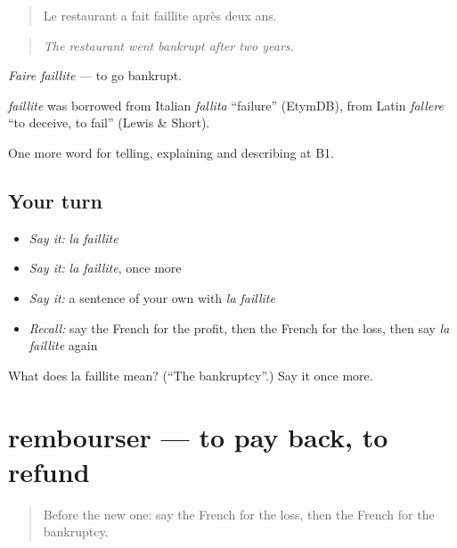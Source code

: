 \begin{quote}
Le restaurant a fait faillite après deux ans.
\end{quote}

\begin{quote}
\emph{The restaurant went bankrupt after two years.}
\end{quote}

\emph{Faire faillite} — to go bankrupt.

\begin{cousinweb}
\emph{faillite} was borrowed from Italian \emph{fallita} \textquotedblleft{}failure\textquotedblright{} (EtymDB), from Latin \emph{fallere} \textquotedblleft{}to deceive, to fail\textquotedblright{} (Lewis \& Short).
\end{cousinweb}

\begin{grammarlens}[title={What you've built}]
One more word for telling, explaining and describing at B1.
\end{grammarlens}

\subsection*{Your turn}
\begin{itemize}
\raggedright
  \item \emph{Say it:} \emph{la faillite}
  \item \emph{Say it:} \emph{la faillite}, once more
  \item \emph{Say it:} a sentence of your own with \emph{la faillite}
  \item \emph{Recall:} say the French for the profit, then the French for the loss, then say \emph{la faillite} again
\end{itemize}

\begin{tcolorbox}[breakable,colback=teal!4,colframe=teal!35!black,title={Before you move on}]
What does la faillite mean? (\textquotedblleft{}The bankruptcy\textquotedblright{}.) Say it once more.
\end{tcolorbox}
\section[rembourser]{rembourser — to pay back, to refund}

\label{lesson:FR-C394-rembourser}



\begin{quote}
Before the new one: say the French for the loss, then the French for the bankruptcy.
\end{quote}

